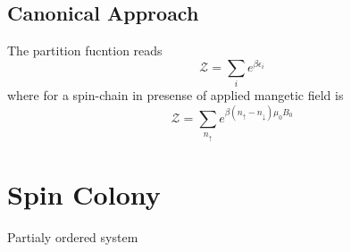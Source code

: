 \documentclass[11pt]{article}
\newcommand{\zl}{\mathcal{Z}}
\newcommand{\upp}{\uparrow}
\newcommand{\dnn}{\downarrow}
\begin{document}
\subsection{Canonical Approach}
The partition fucntion reads
\begin{equation}
  \zl = \sum_i e^{\beta \epsilon_i}
\end{equation}
where for a spin-chain in presense of applied mangetic field is
\begin{equation}
  \zl = \sum_{n_\upp} e^{\beta (n_\upp - n_\dnn)\mu_0 B_0}
\end{equation}
\section{Spin Colony}
Partialy ordered system
\end{document}

